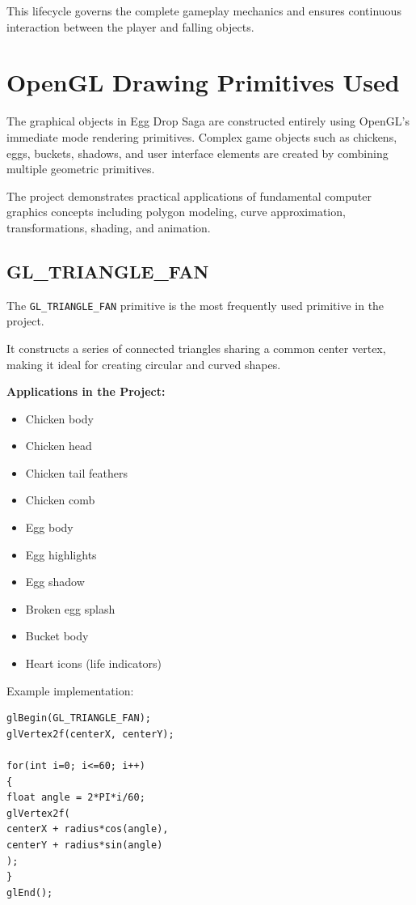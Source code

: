 \documentclass[12pt,a4paper]{report}
\begin{document}
This lifecycle governs the complete gameplay mechanics and ensures continuous interaction between the player and falling objects.

\section{OpenGL Drawing Primitives Used}

The graphical objects in Egg Drop Saga are constructed entirely using OpenGL's immediate mode rendering primitives. Complex game objects such as chickens, eggs, buckets, shadows, and user interface elements are created by combining multiple geometric primitives.

The project demonstrates practical applications of fundamental computer graphics concepts including polygon modeling, curve approximation, transformations, shading, and animation.

\subsection*{GL\_TRIANGLE\_FAN}

The \texttt{GL\_TRIANGLE\_FAN} primitive is the most frequently used primitive in the project.

It constructs a series of connected triangles sharing a common center vertex, making it ideal for creating circular and curved shapes.

\textbf{Applications in the Project:}

\begin{itemize}
\item Chicken body
\item Chicken head
\item Chicken tail feathers
\item Chicken comb
\item Egg body
\item Egg highlights
\item Egg shadow
\item Broken egg splash
\item Bucket body
\item Heart icons (life indicators)
\end{itemize}

Example implementation:

\begin{verbatim}
glBegin(GL_TRIANGLE_FAN);
glVertex2f(centerX, centerY);

for(int i=0; i<=60; i++)
{
float angle = 2*PI*i/60;
glVertex2f(
centerX + radius*cos(angle),
centerY + radius*sin(angle)
);
}
glEnd();
\end{verbatim}
\end{document}
